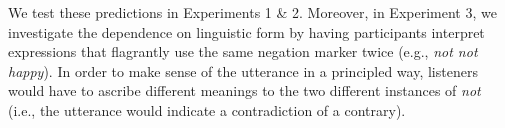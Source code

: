 \documentclass[floatsintext,doc]{apa6}
\newcommand{\ourmodel}{Flexible Negation\xspace}
\begin{document}

We test these predictions in Experiments 1 \& 2.
Moreover, in Experiment 3, we investigate the dependence on linguistic form by having participants interpret expressions that flagrantly use the same negation marker twice (e.g., \emph{not not happy}).
In order to make sense of the utterance in a principled way, listeners would have to ascribe different meanings to the two different instances of \emph{not} (i.e., the utterance would indicate a contradiction of a contrary). 
\end{document}
